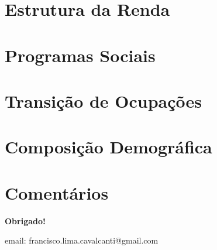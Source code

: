 \documentclass[11pt]{beamer}
\begin{document}


\section{Estrutura da Renda}



\section{Programas Sociais}



\section{Transição de Ocupações}



\section{Composição Demográfica}



\section{Comentários}


\frame
{
    \begin{center}
     \vfill
    \textbf{Obrigado!}
     \\

     \begin{small}
     email: francisco.lima.cavalcanti@gmail.com
     \end{small}
     \vfill
\end{center}
}
\end{document}
